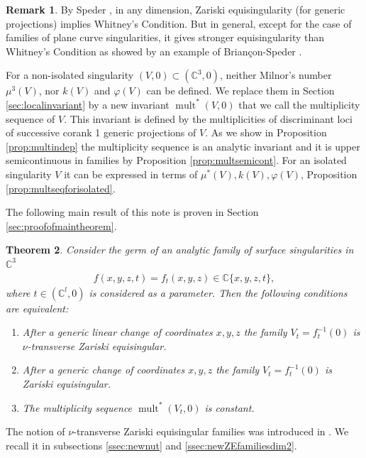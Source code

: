 \documentclass[11pt,a4paper]{amsart}
\newcommand{\1}{{1\!\!1}}
\numberwithin{equation}{section}
\theoremstyle{plain}%
\newtheorem{thm}{Theorem}[section]
\theoremstyle{definition}
\newtheorem{rmk}[thm]{Remark}
\theoremstyle{definition}
\theoremstyle{remark}
\newcommand{\C}{\mathbb{C}}
\renewcommand{\1}{\mathbf{1}}
\newcommand{\inv}{^{-1}}
\DeclareMathOperator{\snu}{mult}
\newcommand{\unt}{$\nu$-transverse }
\newcommand{\multseq}{multiplicity sequence }
\begin{document}
\begin{rmk}
By Speder \cite{speder75}, in any dimension, Zariski equisingularity (for generic projections) implies Whitney's Condition. But in general, except for the case of families of plane curve singularities, it gives stronger equisingularity than Whitney's Condition
 as showed by an example of Briançon-Speder \cite{brianconspeder75b}.  
\end{rmk}

For a non-isolated singularity $(V,0)\subset (\C^3,0)$, neither Milnor's number $\mu^3(V)$, nor $k(V)$ and $\varphi (V)$ can be defined.
  We replace them in Section \ref{sec:localinvariant} by a new invariant $\snu^* (V, 0)$ that we call the \multseq of $V$.  This invariant is defined by the multiplicities of discriminant loci of successive corank 1 generic projections of $V$. As we show in Proposition \ref{prop:multindep} the \multseq  is an analytic invariant and it is upper semicontinuous in families by Proposition \ref{prop:multsemicont}.  For an isolated singularity $V$ it can be expressed in terms of $\mu^*(V), k(V), \varphi (V)$, Proposition \ref{prop:multseqforisolated}.


The following main result of this note is proven in Section \ref{sec:proofofmaintheorem}. 

\begin{thm}\label{thm:mainequivalence2}
Consider the germ of an analytic family of surface singularities in $\C^3$
\begin{align}\label{eq:famwithparameter}
f(x,y,z, t)= f_t(x,y,z) \in \C \{x,y,z,t\},
\end{align} 
where $t\in (\C^l,0)$ is considered as a parameter. 
 Then the following conditions are equivalent:
\begin{enumerate}[label=(\roman*)]
  \item 
After a generic linear change of coordinates $x,y,z$ the family $V_t = f_t\inv (0)$ is  \unt Zariski equisingular.  
  \item 
After a generic change of coordinates $x,y,z$ the family $V_t = f_t\inv (0)$ is   Zariski equisingular.  
\item
The \multseq $\snu^* (V_t, 0)$ is constant.  
\end{enumerate}
\end{thm}

The notion of  \unt Zariski equisingular families was introduced in \cite{PP24}.  We recall it in subsections \ref{ssec:newnut} and \ref{ssec:newZEfamiliesdim2}.  
\end{document}
